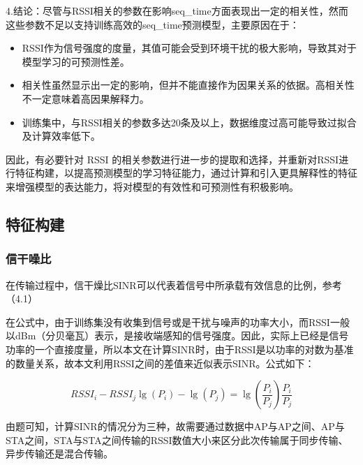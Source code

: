 \documentclass[bwprint]{gmcmthesis}
\begin{document}
4.结论：尽管与RSSI相关的参数在影响seq\_time方面表现出一定的相关性，然而这些参数不足以支持训练高效的seq\_time预测模型，主要原因在于：

\begin{itemize}
	\item RSSI作为信号强度的度量，其值可能会受到环境干扰的极大影响，导致其对于模型学习的可预测性差。
	\item 相关性虽然显示出一定的影响，但并不能直接作为因果关系的依据。高相关性不一定意味着高因果解释力。
	\item 训练集中，与RSSI相关的参数多达20条及以上，数据维度过高可能导致过拟合及计算效率低下。
\end{itemize}

因此，有必要针对 RSSI 的相关参数进行进一步的提取和选择，并重新对RSSI进行特征构建，以提高预测模型的学习特征能力，通过计算和引入更具解释性的特征来增强模型的表达能力，将对模型的有效性和可预测性有积极影响。


\subsection{特征构建}


\subsubsection{信干噪比}

在传输过程中，信干燥比SINR可以代表着信号中所承载有效信息的比例，参考（4.1）



在公式中，由于训练集没有收集到信号或是干扰与噪声的功率大小，而RSSI一般以dBm（分贝毫瓦）表示，是接收端感知的信号强度。因此，实际上已经是信号功率的一个直接度量，所以本文在计算SINR时，由于RSSI是以功率的对数为基准的数量关系，故本文利用RSSI之间的差值来近似表示SINR。公式如下：


\begin{equation}
	RSSI_i-RSSI_j\lg \left( P_i \right) -\lg \left( P_j \right) =\lg \left( \frac{P_i}{P_j} \right) \frac{P_i}{P_j}
\end{equation}

由题可知，计算SINR的情况分为三种，故需要通过数据中AP与AP之间、AP与STA之间，STA与STA之间传输的RSSI数值大小来区分此次传输属于同步传输、异步传输还是混合传输。
\end{document}
